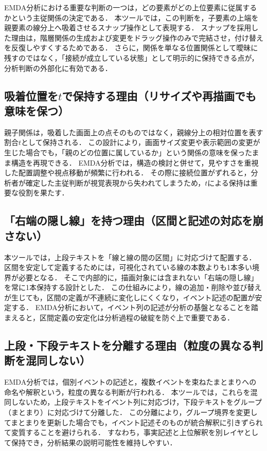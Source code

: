 EMDA分析における重要な判断の一つは，どの要素がどの上位要素に従属するかという主従関係の決定である．
本ツールでは，この判断を，子要素の上端を親要素の線分上へ吸着させるスナップ操作として表現する．
スナップを採用した理由は，階層関係の生成および変更をドラッグ操作のみで完結させ，付け替えを反復しやすくするためである．
さらに，関係を単なる位置関係として曖昧に残すのではなく，「接続が成立している状態」として明示的に保持できる点が，分析判断の外部化に有効である．

\subsection{吸着位置を$t$で保持する理由（リサイズや再描画でも意味を保つ）}

親子関係は，吸着した画面上の点そのものではなく，親線分上の相対位置を表す割合$t$として保持される．
この設計により，画面サイズ変更や表示範囲の変更が生じた場合でも，「親のどの位置に属しているか」という関係の意味を保ったまま構造を再現できる．
EMDA分析では，構造の検討と併せて，見やすさを重視した配置調整や視点移動が頻繁に行われる．
その際に接続位置がずれると，分析者が確定した主従判断が視覚表現から失われてしまうため，$t$による保持は重要な役割を果たす．

\subsection{「右端の隠し線」を持つ理由（区間と記述の対応を崩さない）}

本ツールでは，上段テキストを「線と線の間の区間」に対応づけて配置する．
区間を安定して定義するためには，可視化されている線の本数よりも1本多い境界が必要となる．
そこで内部的に，描画対象には含まれない「右端の隠し線」を常に1本保持する設計とした．
この仕組みにより，線の追加・削除や並び替えが生じても，区間の定義が不連続に変化しにくくなり，イベント記述の配置が安定する．
EMDA分析において，イベント列の記述が分析の基盤となることを踏まえると，区間定義の安定化は分析過程の破綻を防ぐ上で重要である．

\subsection{上段・下段テキストを分離する理由（粒度の異なる判断を混同しない）}

EMDA分析では，個別イベントの記述と，複数イベントを束ねたまとまりへの命名や解釈という，粒度の異なる判断が行われる．
本ツールでは，これらを混同しないため，上段テキストをイベント列に対応づけ，下段テキストをグループ（まとまり）に対応づけて分離した．
この分離により，グループ境界を変更してまとまりを更新した場合でも，イベント記述そのものが統合解釈に引きずられて変質することを避けられる．
すなわち，事実記述と上位解釈を別レイヤとして保持でき，分析結果の説明可能性を維持しやすい．

